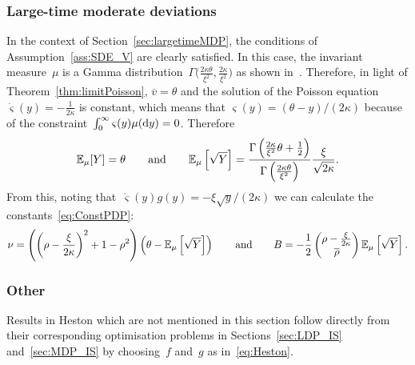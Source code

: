 \subsubsection{Large-time moderate deviations} 
In the context of Section~\ref{sec:largetimeMDP}, 
the conditions of Assumption~\ref{ass:SDE_V} are clearly satisfied. 
In this case, the invariant measure~$\mu$ is a Gamma distribution~$\Gamma\big(\frac{2\kappa\theta}{\xi^2}, \frac{2\kappa}{\xi^2}\big)$ 
as shown in~\cite[Section~3.]{Cox1985ARates}.
Therefore, in light of Theorem~\ref{thm:limitPoisson}, 
$\overline{v} = \theta$ and the solution of the Poisson equation~$\dot{\varsigma}(y)=-\frac{1}{2\kappa}$ is constant, which means
that
$\varsigma(y) = (\theta-y)/(2\kappa)$
because of the constraint~$\int_{0}^{\infty}\varsigma(y)\mu(\mathrm{d} y)=0$.
Therefore 
$$
\mathbb{E}_\mu[Y] = \theta
\qquad\text{and}\qquad
\mathbb{E}_\mu\left[\sqrt{Y}\right]
=\frac{\Gamma\left( \frac{2\kappa}{\xi^2}\theta + \frac{1}{2} \right )}{\Gamma\left( \frac{2\kappa\theta}{\xi^2} \right )} \frac{\xi}{\sqrt{2\kappa}}.
$$
From this, noting that~$\dot{\varsigma}(y)g(y) = -\xi\sqrt{y}/(2\kappa)$ we can calculate the constants~\eqref{eq:ConstPDP}:
\begin{align*}
\nu = \left( \left( \rho - \frac{\xi}{2\kappa} \right)^2 + 1-\rho^2 \right)\left( \theta - \mathbb{E}_\mu\left[\sqrt{Y}\right]\right)
\qquad \text{and} \qquad
B = -\frac{1}{2}
\begin{pmatrix}
\rho - \frac{\xi}{2\kappa}\\
\overline{\rho}\\
\end{pmatrix}\mathbb{E}_\mu\left[\sqrt{Y}\right].
\end{align*}

\subsubsection{Other}
Results in Heston which are not mentioned in this section follow directly from their corresponding optimisation problems in Sections~\ref{sec:LDP_IS} and~\ref{sec:MDP_IS} by choosing~$f$ and~$g$ as in~\eqref{eq:Heston}.

